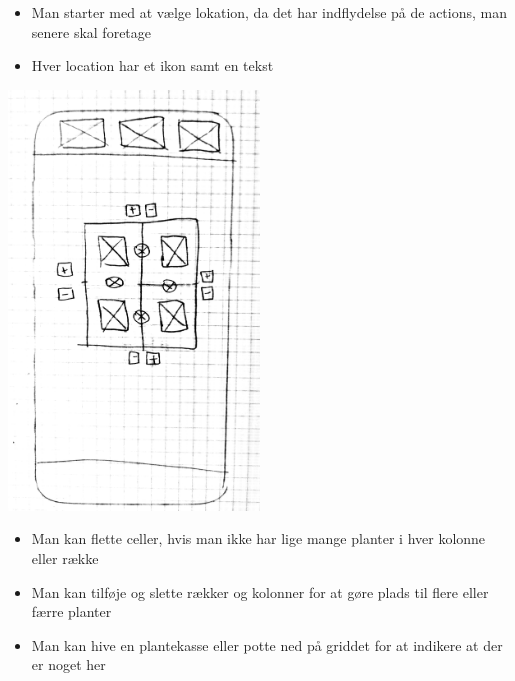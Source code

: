 \begin{itemize}
    \item Man starter med at vælge lokation, da det har indflydelse på de actions, man senere skal foretage
    \item Hver location har et ikon samt en tekst
\end{itemize}

\includegraphics[width=0.5\textwidth]{img/s1-8.jpg}\\

\begin{itemize}
    \item Man kan flette celler, hvis man ikke har lige mange planter i hver kolonne eller række
    \item Man kan tilføje og slette rækker og kolonner for at gøre plads til flere eller færre planter
    \item Man kan hive en plantekasse eller potte ned på griddet for at indikere at der er noget her
\end{itemize}


